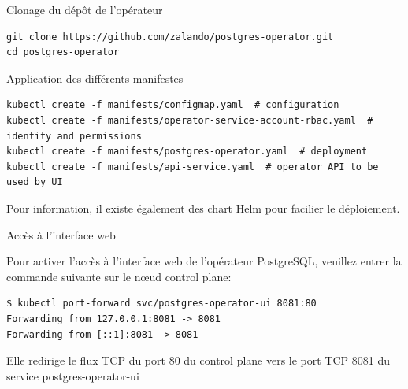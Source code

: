 \begin{frame}[fragile]{Clonage du dépôt de l'opérateur}
   
\begin{tiny}
\begin{Verbatim}[commandchars=\&\#\#]
git clone https://github.com/zalando/postgres-operator.git
cd postgres-operator
\end{Verbatim}
\end{tiny}

\end{frame}


\begin{frame}[fragile]{Application des différents manifestes}
   
\begin{tiny}
\begin{Verbatim}[commandchars=\&\{\}]
kubectl create -f manifests/configmap.yaml  # configuration
kubectl create -f manifests/operator-service-account-rbac.yaml  # identity and permissions
kubectl create -f manifests/postgres-operator.yaml  # deployment
kubectl create -f manifests/api-service.yaml  # operator API to be used by UI
\end{Verbatim}
\end{tiny}

   Pour information, il existe également des chart Helm pour facilier le déploiement.

\end{frame}


\begin{frame}[fragile]{Accès à l'interface web}
   
   Pour activer l'accès à l'interface web de l'opérateur PostgreSQL, veuillez entrer la commande suivante sur le n\oe{}ud control plane:
\begin{tiny}
\begin{Verbatim}[commandchars=\&\{\}]
$ kubectl port-forward svc/postgres-operator-ui 8081:80
Forwarding from 127.0.0.1:8081 -> 8081
Forwarding from [::1]:8081 -> 8081

\end{Verbatim}
\end{tiny}

   Elle redirige le flux TCP du port 80 du control plane vers le port TCP 8081 du service postgres-operator-ui

\end{frame}

